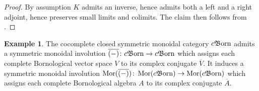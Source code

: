 \documentclass{article}
\newcommand{\Mor}{\operatorname{Mor}}%
\newcommand{\cBorn}{c\mathfrak{B}\hspace{-0.05cm}\operatorname{orn}}%
\numberwithin{equation}{section}
\theoremstyle{definition}
\newtheorem{example}[definition]{Example}
\theoremstyle{theorem}
\begin{document}
\begin{proof}
    By assumption $K$ admits an inverse, hence admits both a left and a right adjoint, hence preserves small limits and colimits. The claim then follows 
    from .
\end{proof}
\begin{example}
    The cocomplete closed symmetric monoidal category $\cBorn$ admits a symmetric monoidal involution $\overline{(-)} \colon \cBorn \to \cBorn$ which 
    assigns each complete Bornological vector space $V$ to its complex conjugate $\overline{V}$. It induces a symmetric monoidal involution 
    $\Mor(\overline{(-)}) \colon \Mor(\cBorn) \to \Mor(\cBorn)$ which assigns each complete Bornological algebra $A$ to its complex conjugate $\overline{A}$.
\end{example}
\end{document}
